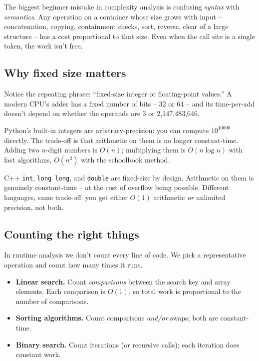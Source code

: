 \documentclass[11pt]{article}
\begin{document}
\begin{warnbox}
The biggest beginner mistake in complexity analysis is confusing
\emph{syntax} with \emph{semantics}. Any operation on a container
whose size grows with input -- concatenation, copying, containment
checks, sort, reverse, clear of a large structure -- has a cost
proportional to that size. Even when the call site is a single
token, the work isn't free.
\end{warnbox}

\subsection{Why fixed size matters}

Notice the repeating phrase: ``fixed-size integer or floating-point
values.'' A modern CPU's adder has a fixed number of bits -- 32 or
64 -- and its time-per-add doesn't depend on whether the operands
are 3 or 2{,}147{,}483{,}646.

\begin{ideabox}
Python's built-in integers are arbitrary-precision: you can compute
$10^{10000}$ directly. The trade-off is that arithmetic on them is
no longer constant-time. Adding two $n$-digit numbers is $O(n)$;
multiplying them is $O(n \log n)$ with fast algorithms, $O(n^2)$ with
the schoolbook method.

C++ \texttt{int}, \texttt{long long}, and \texttt{double} are
fixed-size by design. Arithmetic on them is genuinely constant-time
-- at the cost of overflow being possible. Different languages, same
trade-off: you get either $O(1)$ arithmetic \emph{or} unlimited
precision, not both.
\end{ideabox}

\subsection{Counting the right things}

In runtime analysis we don't count every line of code. We pick a
representative operation and count how many times it runs.

\begin{examplebox}
\begin{itemize}[leftmargin=*]
  \item \textbf{Linear search.} Count \emph{comparisons} between the
        search key and array elements. Each comparison is $O(1)$, so
        total work is proportional to the number of comparisons.
  \item \textbf{Sorting algorithms.} Count comparisons \emph{and/or}
        swaps; both are constant-time.
  \item \textbf{Binary search.} Count iterations (or recursive
        calls); each iteration does constant work.
\end{itemize}
\end{examplebox}
\end{document}
